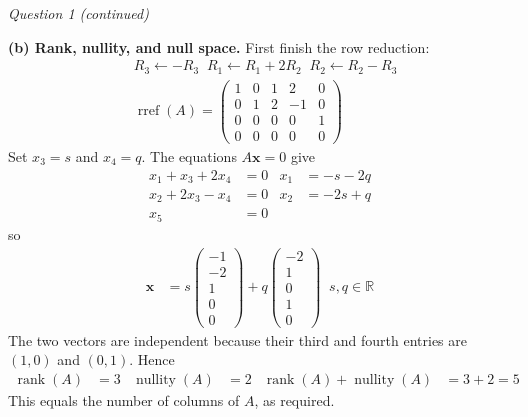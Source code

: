 \documentclass[11pt,a4paper]{article}
\newcommand{\R}{\mathbb{R}}
\newcommand{\rank}{\operatorname{rank}}
\newcommand{\nullity}{\operatorname{nullity}}
\begin{document}
\clearpage
\textit{Question 1 (continued)}

\textbf{(b) Rank, nullity, and null space.} First finish the row reduction:
\begin{align*}
&R_3\leftarrow -R_3\;\;
R_1\leftarrow R_1+2R_2\;\;
R_2\leftarrow R_2-R_3\\
&\operatorname{rref}(A)=
\begin{pmatrix}
1&0&1&2&0\\
0&1&2&-1&0\\
0&0&0&0&1\\
0&0&0&0&0
\end{pmatrix}
\end{align*}
Set $x_3=s$ and $x_4=q$. The equations $A\mathbf{x}=0$ give
\begin{align*}
x_1+x_3+2x_4&=0&x_1&=-s-2q\\
x_2+2x_3-x_4&=0&x_2&=-2s+q\\
x_5&=0
\end{align*}
so
\begin{align*}
\mathbf{x}
&=s\begin{pmatrix}-1\\-2\\1\\0\\0\end{pmatrix}
+q\begin{pmatrix}-2\\1\\0\\1\\0\end{pmatrix}
\;\;s,q\in\R
\end{align*}
The two vectors are independent because their third and fourth entries are $(1,0)$ and $(0,1)$. Hence
\begin{align*}
\rank(A)&=3&\nullity(A)&=2&\rank(A)+\nullity(A)&=3+2=5
\end{align*}
This equals the number of columns of $A$, as required.
\end{document}
